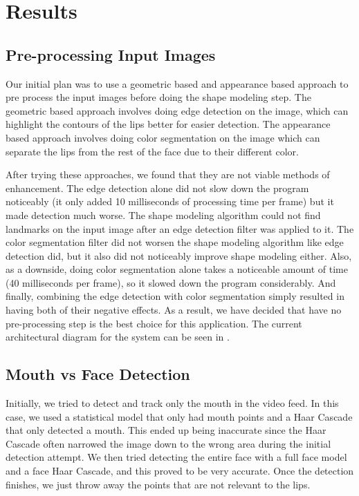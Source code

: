 \chapter{Results}
\label{results}

\section{Pre-processing Input Images}
Our initial plan was to use a geometric based and appearance based approach to pre process the input images before doing the shape modeling step. The geometric based approach involves doing edge detection on the image, which can highlight the contours of the lips better for easier detection. The appearance based approach involves doing color segmentation on the image which can separate the lips from the rest of the face due to their different color. 

After trying these approaches, we found that they are not viable methods of enhancement. The edge detection alone did not slow down the program noticeably (it only added 10 milliseconds of processing time per frame) but it made detection much worse. The shape modeling algorithm could not find landmarks on the input image after an edge detection filter was applied to it. The color segmentation filter did not worsen the shape modeling algorithm like edge detection did, but it also did not noticeably improve shape modeling either. Also, as a downside, doing color segmentation alone takes a noticeable amount of time (40 milliseconds per frame), so it slowed down the program considerably. And finally, combining the edge detection with color segmentation simply resulted in having both of their negative effects. As a result, we have decided that have no pre-processing step is the best choice for this application. The current architectural diagram for the system can be seen in .

\section{Mouth vs Face Detection}
Initially, we tried to detect and track only the mouth in the video feed. In this case, we used a statistical model that only had mouth points and a Haar Cascade that only detected a mouth. This ended up being inaccurate since the Haar Cascade often narrowed the image down to the wrong area during the initial detection attempt. We then tried detecting the entire face with a full face model and a face Haar Cascade, and this proved to be very accurate. Once the detection finishes, we just throw away the points that are not relevant to the lips.

